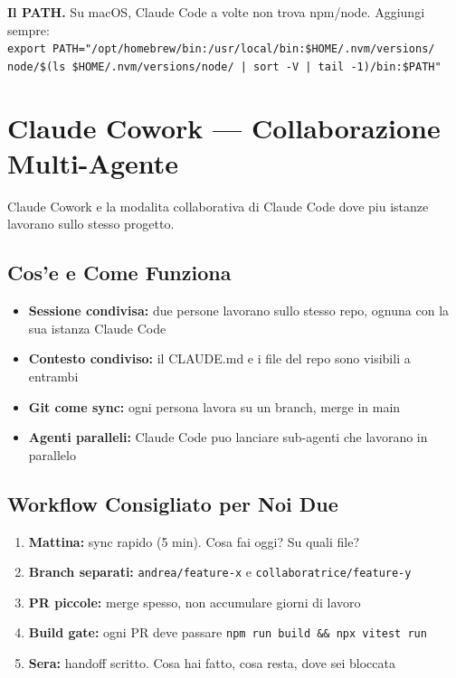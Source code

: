 \documentclass[11pt,a4paper]{article}
\begin{document}
\begin{consiglio}
\textbf{Il PATH.} Su macOS, Claude Code a volte non trova npm/node. Aggiungi sempre:\\
\texttt{export PATH="/opt/homebrew/bin:/usr/local/bin:\$HOME/.nvm/versions/\\node/\$(ls \$HOME/.nvm/versions/node/ | sort -V | tail -1)/bin:\$PATH"}
\end{consiglio}

\section{Claude Cowork --- Collaborazione Multi-Agente}

Claude Cowork e la modalita collaborativa di Claude Code dove piu istanze lavorano sullo stesso progetto.

\subsection{Cos'e e Come Funziona}

\begin{itemize}[leftmargin=2em]
  \item \textbf{Sessione condivisa:} due persone lavorano sullo stesso repo, ognuna con la sua istanza Claude Code
  \item \textbf{Contesto condiviso:} il CLAUDE.md e i file del repo sono visibili a entrambi
  \item \textbf{Git come sync:} ogni persona lavora su un branch, merge in main
  \item \textbf{Agenti paralleli:} Claude Code puo lanciare sub-agenti che lavorano in parallelo
\end{itemize}

\subsection{Workflow Consigliato per Noi Due}

\begin{enumerate}[leftmargin=2em]
  \item \textbf{Mattina:} sync rapido (5 min). Cosa fai oggi? Su quali file?
  \item \textbf{Branch separati:} \texttt{andrea/feature-x} e \texttt{collaboratrice/feature-y}
  \item \textbf{PR piccole:} merge spesso, non accumulare giorni di lavoro
  \item \textbf{Build gate:} ogni PR deve passare \texttt{npm run build \&\& npx vitest run}
  \item \textbf{Sera:} handoff scritto. Cosa hai fatto, cosa resta, dove sei bloccata
\end{enumerate}
\end{document}

